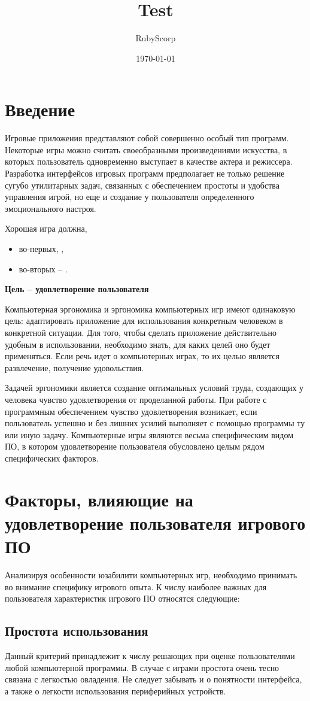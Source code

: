 \documentclass{article}
\title{Test}
\author{RubyScorp}
\date{\today}
\begin{document}
\section{Введение}
Игровые приложения представляют собой совершенно особый тип программ. Некоторые игры можно считать своеобразными произведениями искусства, в которых пользователь одновременно выступает в качестве актера и режиссера. Разработка интерфейсов игровых программ предполагает не только решение сугубо утилитарных задач, связанных с обеспечением простоты и удобства управления игрой, но еще и создание у пользователя определенного эмоционального настроя.

\bigskip\noindent Хорошая игра должна,
\begin{itemize}
  \item во-первых, ,
  \item во-вторых -- .
\end{itemize}

\textbf{Цель -- удовлетворение пользователя}

Компьютерная эргономика и эргономика компьютерных игр имеют одинаковую цель: адаптировать приложение для использования конкретным человеком в конкретной ситуации. Для того, чтобы сделать приложение действительно удобным в использовании, необходимо знать, для каких целей оно будет применяться. Если речь идет о компьютерных играх, то их целью является развлечение, получение удовольствия.

Задачей эргономики является создание оптимальных условий труда, создающих у человека чувство удовлетворения от проделанной работы. При работе с программным обеспечением чувство удовлетворения возникает, если пользователь успешно и без лишних усилий выполняет с помощью программы ту или иную задачу. Компьютерные игры являются весьма специфическим видом ПО, в котором удовлетворение пользователя обусловлено целым рядом специфических факторов.

\section{Факторы, влияющие на удовлетворение пользователя игрового ПО}
Анализируя особенности юзабилити компьютерных игр, необходимо принимать во внимание специфику игрового опыта. К числу наиболее важных для пользователя характеристик игрового ПО относятся следующие:

\subsection{Простота использования}
Данный критерий принадлежит к числу решающих при оценке пользователями любой компьютерной программы. В случае с играми простота очень тесно связана с легкостью овладения. Не следует забывать и о понятности интерфейса, а также о легкости использования периферийных устройств.
\end{document}
